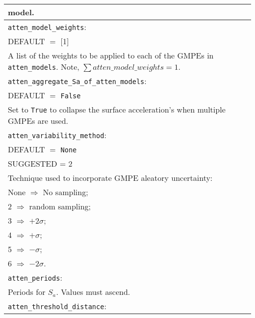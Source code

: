 \documentclass[a4paper, 12pt]{report}
\begin{document}
\begin{tabular}{|p{\textwidth}|}
  \hspace{14.5em}  model. \\
\hline \vspace{0.1em} \texttt{atten\_model\_weights}: \\
DEFAULT $=$ [1] \\
A list of the weights to be applied to each of the GMPEs in
\texttt{atten\_models}.  Note, $\sum  atten\_model\_weights=1$. \\
\hline \vspace{0.1em}
\texttt{atten\_aggregate\_Sa\_of\_atten\_models}: \\
DEFAULT $=$ \texttt{False} \\
Set to \texttt{True} to collapse the surface acceleration's when
multiple GMPEs are used.\\
\hline \vspace{0.1em} \texttt{atten\_variability\_method}: \\
DEFAULT $=$ \texttt{None} \\
SUGGESTED = 2 \\
 Technique used to
incorporate GMPE aleatory uncertainty: \\
 \hspace{0.5em} None $\Rightarrow$ No sampling; \\
 \hspace{0.5em} 2 $\Rightarrow$ random sampling; \\
 \hspace{0.5em} 3 $\Rightarrow$ $+2\sigma$; \\
 \hspace{0.5em} 4 $\Rightarrow$ $+\sigma$; \\
 \hspace{0.5em} 5 $\Rightarrow$ $-\sigma$; \\
 \hspace{0.5em} 6 $\Rightarrow$ $-2\sigma$.\\
\hline \vspace{0.1em} \texttt{atten\_periods}: \\
Periods for $S_a$. Values must ascend. \\
\hline \vspace{0.1em} \texttt{atten\_threshold\_distance}: \\

\end{tabular}
\end{document}
